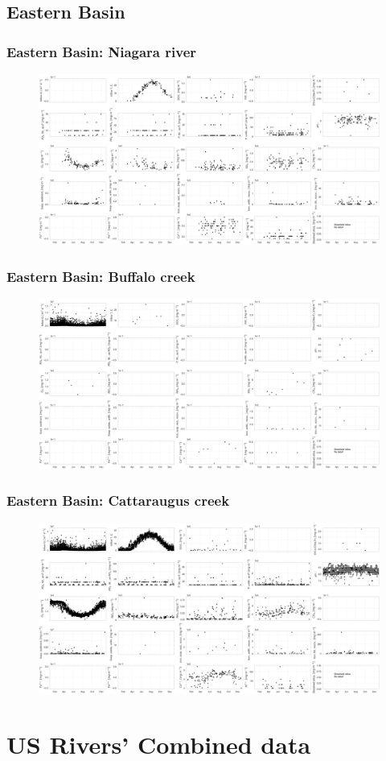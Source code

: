 \documentclass{beamer}
\begin{document}
\subsection{Eastern Basin}
\label{sub:eastern_basin}


\begin{frame}
\frametitle{Eastern Basin: Niagara river}
\begin{figure}
\includegraphics[width=\textwidth]{rivers/Eastern basin/plot_1yr niagarariver.png}
\end{figure}
\end{frame}

\begin{frame}
\frametitle{Eastern Basin: Buffalo creek}
\begin{figure}
\includegraphics[width=\textwidth]{rivers/Eastern basin/plot_1yr Buffalocreek.png}
\end{figure}
\end{frame}

\begin{frame}
\frametitle{Eastern Basin: Cattaraugus creek}
\begin{figure}
\includegraphics[width=\textwidth]{rivers/Eastern basin/plot_1yr cattarauguscreek.png}
\end{figure}
\end{frame}



\section{US Rivers' Combined data}
\label{sec:us_rivers_combined_data}
\end{document}
